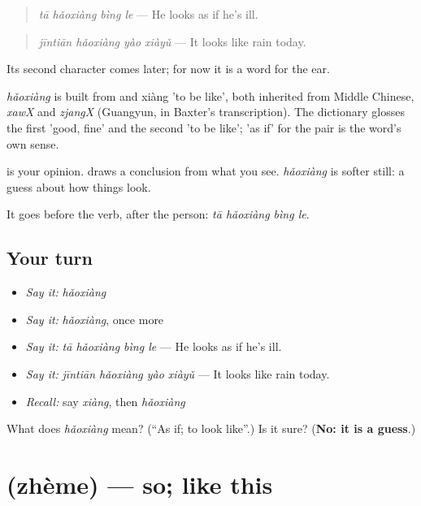 \begin{quote}
\emph{tā hǎoxiàng bìng le} — He looks as if he's ill.
\end{quote}

\begin{quote}
\emph{jīntiān hǎoxiàng yào xiàyǔ} — It looks like rain today.
\end{quote}

Its second character comes later; for now it is a word for the ear.

\begin{cousinweb}
\emph{hǎoxiàng} is built from  and xiàng 'to be like', both inherited from Middle Chinese, \emph{xawX} and \emph{zjangX} (Guangyun, in Baxter's transcription). The dictionary glosses the first 'good, fine' and the second 'to be like'; 'as if' for the pair is the word's own sense.
\end{cousinweb}

\begin{grammarlens}[title={What you've built}]
 is your opinion.  draws a conclusion from what you see. \emph{hǎoxiàng} is softer still: a guess about how things look.

It goes before the verb, after the person: \emph{tā hǎoxiàng bìng le}.
\end{grammarlens}

\subsection*{Your turn}
\begin{itemize}
\raggedright
  \item \emph{Say it:} \emph{hǎoxiàng}
  \item \emph{Say it:} \emph{hǎoxiàng}, once more
  \item \emph{Say it:} \emph{tā hǎoxiàng bìng le} — He looks as if he's ill.
  \item \emph{Say it:} \emph{jīntiān hǎoxiàng yào xiàyǔ} — It looks like rain today.
  \item \emph{Recall:} say \emph{xiàng}, then \emph{hǎoxiàng}
\end{itemize}

\begin{tcolorbox}[breakable,colback=teal!4,colframe=teal!35!black,title={Before you move on}]
What does \emph{hǎoxiàng} mean? (\textquotedblleft{}As if; to look like\textquotedblright{}.) Is it sure? (\textbf{No: it is a guess}.)
\end{tcolorbox}
\section[\texorpdfstring{\zh{这么} (zhème)}{这么 (zhème)}]{ (zhème) — so; like this}

